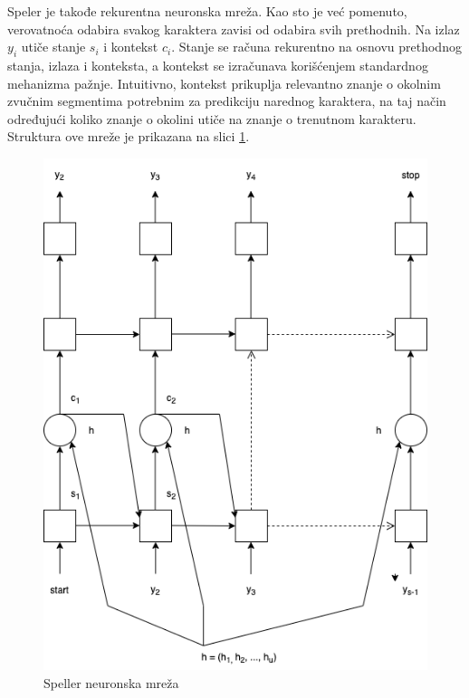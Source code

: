 \documentclass[a4paper]{article}
\begin{document}
Speler je takođe rekurentna neuronska mreža.
Kao sto je već pomenuto, verovatnoća odabira svakog karaktera zavisi od odabira svih prethodnih.
Na izlaz $y_i$ utiče stanje $s_i$ i kontekst $c_i$.
Stanje se računa rekurentno na osnovu prethodnog stanja, izlaza i konteksta, a kontekst se izračunava korišćenjem standardnog mehanizma pažnje.
Intuitivno, kontekst prikuplja relevantno znanje o okolnim zvučnim segmentima potrebnim za predikciju narednog karaktera, na taj način određujući koliko znanje o okolini utiče na znanje o trenutnom karakteru.
Struktura ove mreže je prikazana na slici \ref{fig:speller_model}. 
\begin{figure}[h!]
  \begin{center}
    \includegraphics[scale=0.3]{speller.png}
  \end{center}
  \caption{Speller neuronska mreža}
  \label{fig:speller_model}
\end{figure}
\end{document}
